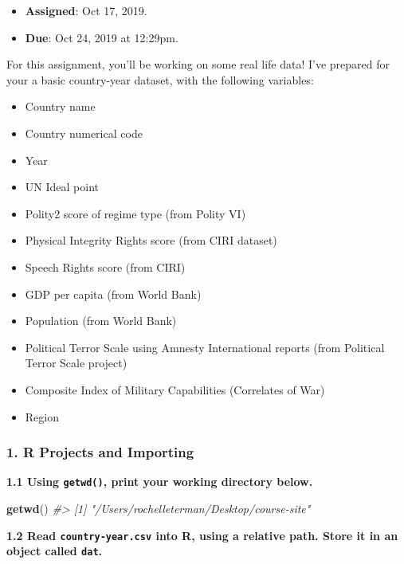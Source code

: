 \documentclass[]{book}
\newenvironment{Shaded}{\begin{snugshade}}{\end{snugshade}}
\newcommand{\KeywordTok}[1]{\textcolor[rgb]{0.13,0.29,0.53}{\textbf{#1}}}
\newcommand{\CommentTok}[1]{\textcolor[rgb]{0.56,0.35,0.01}{\textit{#1}}}
\newcommand{\NormalTok}[1]{#1}
\providecommand{\tightlist}{%
  \setlength{\itemsep}{0pt}\setlength{\parskip}{0pt}}
\begin{document}
\begin{itemize}
\tightlist
\item
  \textbf{Assigned}: Oct 17, 2019.
\item
  \textbf{Due}: Oct 24, 2019 at 12:29pm.
\end{itemize}

For this assignment, you'll be working on some real life data! I've
prepared for your a basic country-year dataset, with the following
variables:

\begin{itemize}
\tightlist
\item
  Country name
\item
  Country numerical code
\item
  Year
\item
  UN Ideal point
\item
  Polity2 score of regime type (from Polity VI)
\item
  Physical Integrity Rights score (from CIRI dataset)
\item
  Speech Rights score (from CIRI)
\item
  GDP per capita (from World Bank)
\item
  Population (from World Bank)
\item
  Political Terror Scale using Amnesty International reports (from
  Political Terror Scale project)
\item
  Composite Index of Military Capabilities (Correlates of War)
\item
  Region
\end{itemize}

\subsubsection*{1. R Projects and
Importing}\label{r-projects-and-importing}

\textbf{1.1 Using \texttt{getwd()}, print your working directory below.}

\begin{Shaded}
\begin{Highlighting}[]
\KeywordTok{getwd}\NormalTok{()}
\CommentTok{#> [1] "/Users/rochelleterman/Desktop/course-site"}
\end{Highlighting}
\end{Shaded}

\textbf{1.2 Read \texttt{country-year.csv} into R, using a relative
path. Store it in an object called \texttt{dat}.}
\end{document}
